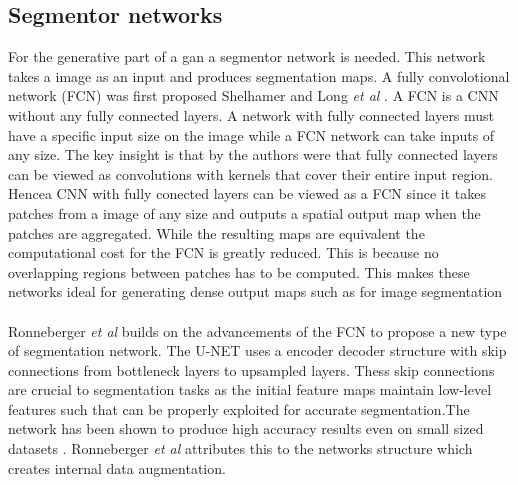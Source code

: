 \documentclass[a4paper,11pt]{article}
\begin{document}
\subsection{Segmentor networks}
For the generative part of a gan a segmentor network is needed. This network takes a image as an input and produces segmentation maps.
A fully convolotional network (FCN) was first proposed Shelhamer and Long \textit{et al} \citep{shelhamer_fully_2016}. A FCN is a CNN without any fully connected layers. A network with fully connected layers must have a specific input size on the image while a FCN network can take inputs of any size. The key insight is that by the authors were that fully connected layers can be viewed as convolutions with kernels that cover their entire input region. Hencea CNN with fully conected layers can be viewed as a FCN since it takes patches from a image of any size and outputs a spatial output map when the patches are aggregated. While the resulting maps are equivalent the computational cost for the FCN is greatly reduced. This is because no overlapping regions between patches has to be computed. This makes these networks ideal for generating dense output maps such as for image segmentation\\
\\
Ronneberger \textit{et al} \cite{ronneberger_u-net:_2015} builds on the advancements of the FCN to propose a new type of segmentation network. The U-NET uses a encoder decoder structure with skip connections from bottleneck layers to upsampled layers. Thess skip connections are crucial to segmentation tasks as the initial feature
maps maintain low-level features such that can be properly exploited for accurate segmentation.The network has been shown to produce high accuracy results even on small sized datasets \cite{son_retinal_2017, ronneberger_u-net:_2015, isola_image--image_2016, xue_segan:_2017, yang_automatic_2017}. Ronneberger \textit{et al} \cite{ronneberger_u-net:_2015} attributes this to the networks structure which creates internal data augmentation.
\end{document}
